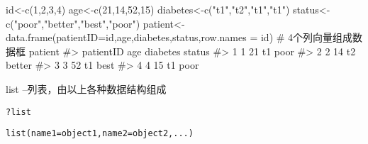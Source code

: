 \documentclass[
  letterpaper,
  DIV=11,
  numbers=noendperiod]{scrreprt}
\newenvironment{Shaded}{\begin{snugshade}}{\end{snugshade}}
\newcommand{\AttributeTok}[1]{\textcolor[rgb]{0.40,0.45,0.13}{#1}}
\newcommand{\CommentTok}[1]{\textcolor[rgb]{0.37,0.37,0.37}{#1}}
\newcommand{\DecValTok}[1]{\textcolor[rgb]{0.68,0.00,0.00}{#1}}
\newcommand{\FunctionTok}[1]{\textcolor[rgb]{0.28,0.35,0.67}{#1}}
\newcommand{\NormalTok}[1]{\textcolor[rgb]{0.00,0.23,0.31}{#1}}
\newcommand{\OtherTok}[1]{\textcolor[rgb]{0.00,0.23,0.31}{#1}}
\newcommand{\StringTok}[1]{\textcolor[rgb]{0.13,0.47,0.30}{#1}}
\begin{document}
\begin{Shaded}
\begin{Highlighting}[]
\NormalTok{id}\OtherTok{\textless{}{-}}\FunctionTok{c}\NormalTok{(}\DecValTok{1}\NormalTok{,}\DecValTok{2}\NormalTok{,}\DecValTok{3}\NormalTok{,}\DecValTok{4}\NormalTok{) }
\NormalTok{age}\OtherTok{\textless{}{-}}\FunctionTok{c}\NormalTok{(}\DecValTok{21}\NormalTok{,}\DecValTok{14}\NormalTok{,}\DecValTok{52}\NormalTok{,}\DecValTok{15}\NormalTok{) }
\NormalTok{diabetes}\OtherTok{\textless{}{-}}\FunctionTok{c}\NormalTok{(}\StringTok{"t1"}\NormalTok{,}\StringTok{"t2"}\NormalTok{,}\StringTok{"t1"}\NormalTok{,}\StringTok{"t1"}\NormalTok{) }
\NormalTok{status}\OtherTok{\textless{}{-}}\FunctionTok{c}\NormalTok{(}\StringTok{"poor"}\NormalTok{,}\StringTok{"better"}\NormalTok{,}\StringTok{"best"}\NormalTok{,}\StringTok{"poor"}\NormalTok{) }
\NormalTok{patient}\OtherTok{\textless{}{-}}\FunctionTok{data.frame}\NormalTok{(}\AttributeTok{patientID=}\NormalTok{id,age,diabetes,status,}\AttributeTok{row.names =}\NormalTok{ id) }\CommentTok{\# 4个列向量组成数据框 }
\NormalTok{patient}
\CommentTok{\#\textgreater{}   patientID age diabetes status}
\CommentTok{\#\textgreater{} 1         1  21       t1   poor}
\CommentTok{\#\textgreater{} 2         2  14       t2 better}
\CommentTok{\#\textgreater{} 3         3  52       t1   best}
\CommentTok{\#\textgreater{} 4         4  15       t1   poor}
\end{Highlighting}
\end{Shaded}

list --列表，由以上各种数据结构组成

\texttt{?list}

\texttt{list(name1=object1,name2=object2,...)}
\end{document}
